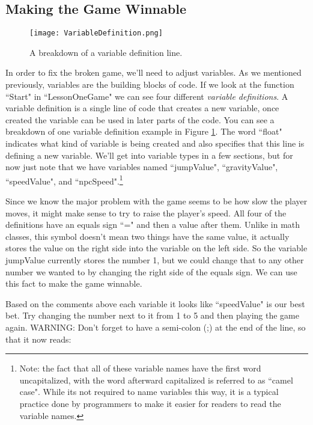 \documentclass{article}
\begin{document}
\subsection{Making the Game Winnable}

\begin{figure}
  \texttt{[image: VariableDefinition.png]}
  \caption{A breakdown of a variable definition line.}
  \label{fig:definition}
\end{figure}

In order to fix the broken game, we'll need to adjust variables. As we mentioned previously, variables are the building blocks of code. If we look at the function ``Start" in ``LessonOneGame" we can see four different \textit{variable definitions}. A variable definition is a single line of code that creates a new variable, once created the variable can be used in later parts of the code. You can see a breakdown of one variable definition example in Figure \ref{fig:definition}. The word ``float" indicates what kind of variable is being created and also specifies that this line is defining a new variable. We'll get into variable types in a few sections, but for now just note that we have variables named ``jumpValue", ``gravityValue", ``speedValue", and ``npcSpeed".\footnote{Note: the fact that all of these variable names have the first word uncapitalized, with the word afterward capitalized is referred to as ``camel case". While its not required to name variables this way, it is a typical practice done by programmers to make it easier for readers to read the variable names.} 

Since we know the major problem with the game seems to be how slow the player moves, it might make sense to try to raise the player's speed. All four of the definitions have an equals sign ``=" and then a value after them. Unlike in math classes, this symbol doesn't mean two things have the same value, it actually stores the value on the right side into the variable on the left side. So the variable jumpValue currently stores the number 1, but we could change that to any other number we wanted to by changing the right side of the equals sign. We can use this fact to make the game winnable. 

Based on the comments above each variable it looks like ``speedValue" is our best bet. Try changing the number next to it from 1 to 5 and then playing the game again. WARNING: Don't forget to have a semi-colon (;) at the end of the line, so that it now reads: 
\end{document}
